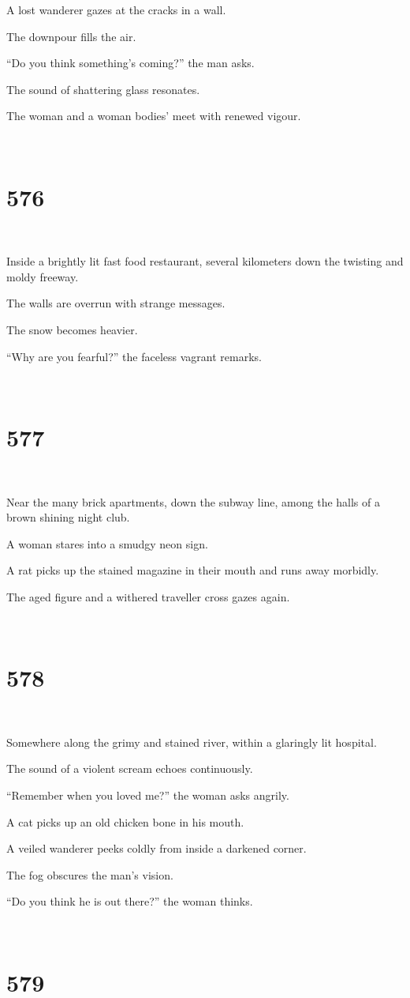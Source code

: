 \documentclass{report}
\begin{document}
A lost wanderer gazes at the cracks in a wall.

The downpour fills the air.

``Do you think something's coming?'' the man asks.

The sound of shattering glass resonates.

The woman and a woman bodies' meet with renewed vigour.

~
\chapter*{576}
~

Inside a brightly lit fast food restaurant, several kilometers down the twisting and moldy freeway.

The walls are overrun with strange messages.

The snow becomes heavier.

``Why are you fearful?'' the faceless vagrant remarks.

~
\chapter*{577}
~

Near the many brick apartments, down the subway line, among the halls of a brown shining night club.

A woman stares into a smudgy neon sign.

A rat picks up the stained magazine in their mouth and runs away morbidly.

The aged figure and a withered traveller cross gazes again.

~
\chapter*{578}
~

Somewhere along the grimy and stained river, within a glaringly lit hospital.

The sound of a violent scream echoes continuously.

``Remember when you loved me?'' the woman asks angrily.

A cat picks up an old chicken bone in his mouth.

A veiled wanderer peeks coldly from inside a darkened corner.

The fog obscures the man's vision.

``Do you think he is out there?'' the woman thinks.

~
\chapter*{579}
~
\end{document}
